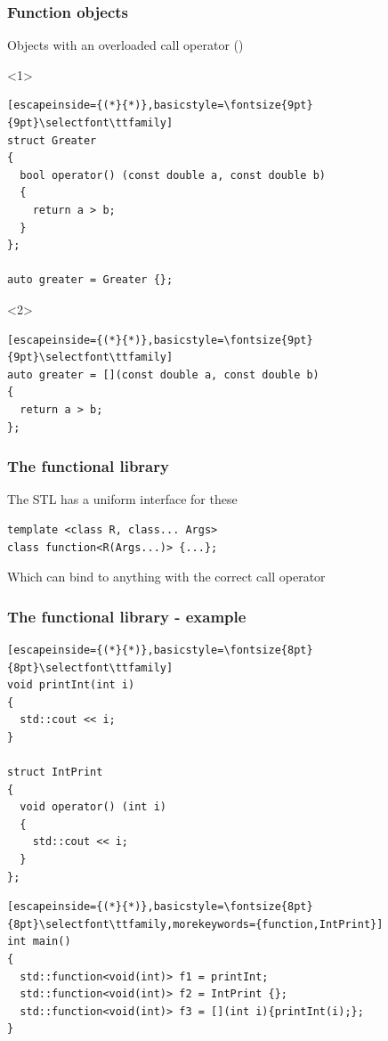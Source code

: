 \documentclass[14pt,a4paper,dvipsnames,usenames]{beamer}
\begin{document}
\begin{frame}[fragile]
  \frametitle{Function objects}

  Objects with an overloaded call operator {\large\color{Tropiteal}()}

  \begin{overlayarea}{\textwidth}{3cm}

    \begin{onlyenv}<1>
      \begin{lstlisting}[escapeinside={(*}{*)},basicstyle=\fontsize{9pt}{9pt}\selectfont\ttfamily]
struct Greater
{
  bool operator() (const double a, const double b)
  {
    return a > b;
  }
};

auto greater = Greater {};
      \end{lstlisting}
    \end{onlyenv}

    \begin{onlyenv}<2>
      \begin{lstlisting}[escapeinside={(*}{*)},basicstyle=\fontsize{9pt}{9pt}\selectfont\ttfamily]
auto greater = [](const double a, const double b)
{
  return a > b;
};
      \end{lstlisting}
    \end{onlyenv}

  \end{overlayarea}
  
\end{frame}

\begin{frame}[fragile]
  \frametitle{The functional library}

  The STL has a uniform interface for these

  \vspace{.5cm}
  \begin{lstlisting}[basicstyle=\ttfamily]
template <class R, class... Args>
class function<R(Args...)> {...};
  \end{lstlisting}

  \vspace{.5cm}
  Which can bind to anything with the correct call operator

  
\end{frame}

\begin{frame}[fragile]
  \frametitle{The functional library - example}

  \begin{lstlisting}[escapeinside={(*}{*)},basicstyle=\fontsize{8pt}{8pt}\selectfont\ttfamily]
void printInt(int i)
{
  std::cout << i;
}

struct IntPrint
{
  void operator() (int i)
  {
    std::cout << i;
  }
};
  \end{lstlisting} 
  \begin{lstlisting}[escapeinside={(*}{*)},basicstyle=\fontsize{8pt}{8pt}\selectfont\ttfamily,morekeywords={function,IntPrint}]
int main()
{
  std::function<void(int)> f1 = printInt;
  std::function<void(int)> f2 = IntPrint {};
  std::function<void(int)> f3 = [](int i){printInt(i);};
}
  \end{lstlisting} 
\end{frame}
\end{document}
